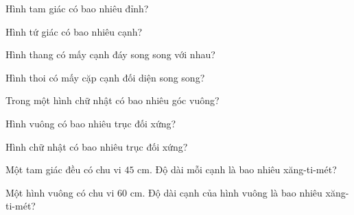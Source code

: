 
\begin{ex}
  Hình tam giác có bao nhiêu đỉnh?
\end{ex}

\begin{ex}
  Hình tứ giác có bao nhiêu cạnh?
\end{ex}

\begin{ex}
  Hình thang có mấy cạnh đáy song song với nhau?
\end{ex}

\begin{ex}
  Hình thoi có mấy cặp cạnh đối diện song song?
\end{ex}

\begin{ex}
  Trong một hình chữ nhật có bao nhiêu góc vuông?
\end{ex}

\begin{ex}
  Hình vuông có bao nhiêu trục đối xứng?
\end{ex}

\begin{ex}
  Hình chữ nhật có bao nhiêu trục đối xứng?
\end{ex}

\begin{ex}
  Một tam giác đều có chu vi $45\text{ cm}$. Độ dài mỗi cạnh là bao nhiêu xăng-ti-mét?
\end{ex}

\begin{ex}
  Một hình vuông có chu vi $60\text{ cm}$. Độ dài cạnh của hình vuông là bao nhiêu xăng-ti-mét?
\end{ex}

